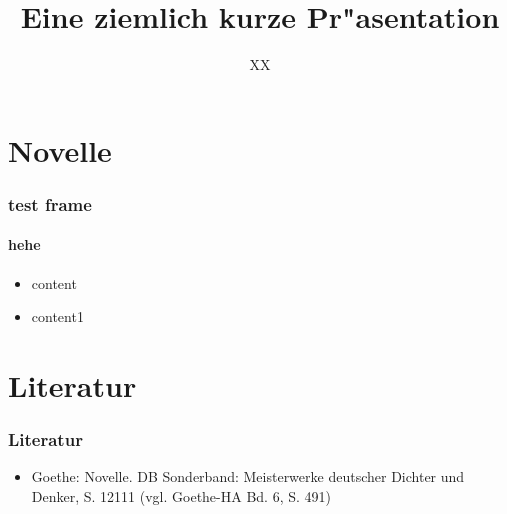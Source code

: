 \documentclass[ddcfooter]{tudbeamer}
\begin{document}
\title[Kurze Pr"asentation]{Eine ziemlich kurze Pr"asentation}
\author{XX}
\maketitle
\section{Novelle}

\begin{frame}
\frametitle{test frame}
\framesubtitle{hehe}
\begin{itemize}
\pause \item content
\pause \item content1
\end{itemize}

\end{frame}

\section{Literatur}
\begin{frame}
\frametitle*{Literatur}
\begin{itemize}
\item Goethe: Novelle. DB Sonderband: Meisterwerke deutscher Dichter und Denker, S. 12111 (vgl. Goethe-HA Bd. 6, S. 491)
\end{itemize}
\end{frame}

 
\end{document}
